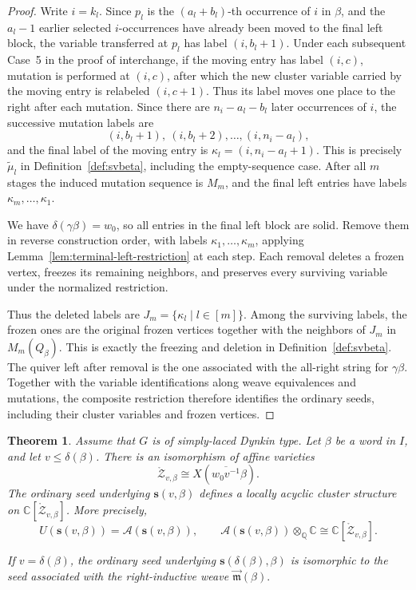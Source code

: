 \documentclass[12pt, reqno]{amsart}
\theoremstyle{plain}
\newtheorem{theorem}{Theorem}[section]
\theoremstyle{definition}
\numberwithin{equation}{section}
\begin{document}
\begin{proof}
Write \(i=k_l\). Since \(p_l\) is the \((a_l+b_l)\)-th occurrence of \(i\) in \(\beta\), and the \(a_l-1\) earlier selected \(i\)-occurrences have already been moved to the final left block, the variable transferred at \(p_l\) has label \((i,b_l+1)\). Under each subsequent Case~5 in the proof
of \cite[Theorem~6.8]{casals2025cluster} interchange, if the moving entry has label \((i,c)\), mutation is performed at \((i,c)\), after which the new cluster variable carried by the moving entry is relabeled \((i,c+1)\). Thus its label moves one place to the right after each mutation. Since there are \(n_i-a_l-b_l\) later occurrences of \(i\), the successive mutation labels are
$$
(i,b_l+1),\ (i,b_l+2),\ldots,(i,n_i-a_l),
$$
and the final label of the moving entry is
$
\kappa_l=(i,n_i-a_l+1).
$
 This is precisely
\(\widetilde\mu_l\) in Definition~\ref{def:svbeta}, including
the empty-sequence case. After all \(m\) stages the induced
mutation sequence is \(M_m\), and the final left entries have
labels \(\kappa_m,\ldots,\kappa_1\).

We have \(\delta(\gamma\beta)=w_0\), so all entries in the final
left block are solid. Remove them in reverse construction order,
with labels \(\kappa_1,\ldots,\kappa_m\), applying
Lemma~\ref{lem:terminal-left-restriction} at each step. Each removal
deletes a frozen vertex, freezes its remaining neighbors, and
preserves every surviving variable under the normalized restriction.

Thus the deleted labels are \(J_m=\{\kappa_l\mid l\in[m]\}\).
Among the surviving labels, the frozen ones are the original
frozen vertices together with the neighbors of \(J_m\) in
\(M_m(Q_\beta)\). This is exactly the freezing and deletion in
Definition~\ref{def:svbeta}. The quiver left after removal is the
one associated with the all-right string for \(\gamma\beta\).
Together with the variable identifications along weave equivalences
and mutations, the composite restriction therefore identifies the
ordinary seeds, including their cluster variables and frozen vertices.
\end{proof}

\begin{theorem}\label{thm:clusterproduct}
Assume that \(G\) is of simply-laced Dynkin type. Let \(\beta\) be a word in
\(I\), and let \(v\leq \delta(\beta)\). There is an isomorphism of
affine varieties
\[
\mathring{\mathcal Z}_{v,\beta}
\cong
X(\overline{w_0v^{-1}}\beta).
\]
The ordinary seed underlying \(\mathbf{s}(v,\beta)\) defines a
locally acyclic cluster structure on
\(\mathbb C[\mathring{\mathcal Z}_{v,\beta}]\). More precisely,
\[
U(\mathbf{s}(v,\beta))=\mathcal A(\mathbf{s}(v,\beta)),
\qquad
\mathcal A(\mathbf{s}(v,\beta))\otimes_{\mathbb Q}\mathbb C
\cong\mathbb C[\mathring{\mathcal Z}_{v,\beta}].
\]

If \(v=\delta(\beta)\), the ordinary seed underlying
\(\mathbf{s}(\delta(\beta),\beta)\) is isomorphic to the seed
associated with the right-inductive weave
\(
\overrightarrow{\mathfrak m}(\beta).
\)
\end{theorem}
\end{document}
